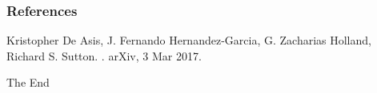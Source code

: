 \documentclass{beamer}
\begin{document}
\begin{frame}
  \frametitle<presentation>{References}

  \begin{thebibliography}{10}

  \beamertemplatebookbibitems

  \beamertemplatearticlebibitems

    Kristopher De Asis, J. Fernando Hernandez-Garcia, G. Zacharias Holland,
    Richard S. Sutton.
    .
    \newblock arXiv, 3 Mar 2017.

  \end{thebibliography}
\end{frame}


\begin{frame}
\Huge{\centerline{The End}}
\end{frame}

\end{document}
